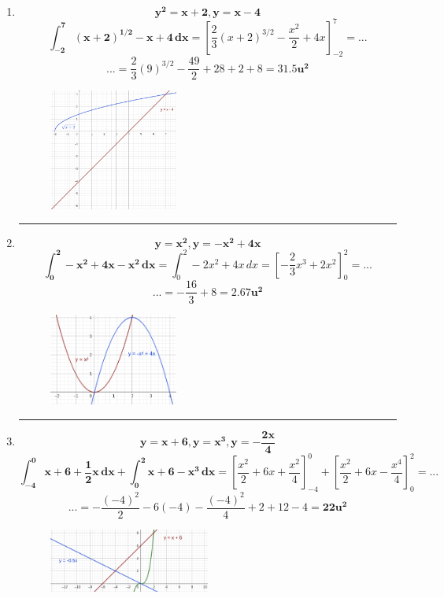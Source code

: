 \documentclass[12pt]{article}
\begin{document}
\begin{itemize}
\begin{enumerate}
                \newpage\hrule
                \item \[\bm{y^2 = x + 2, y = x - 4}\]
                    \[\bm{\int_{-2}^{7} (x + 2)^{1/2} - x + 4 \, dx} = \left[\frac{2}{3}(x + 2)^{3/2} - \frac{x^2}{2} + 4x\right]_{-2}^{7} = ...\]
                    \[... = \frac{2}{3}(9)^{3/2} - \frac{49}{2} + 28 + 2 + 8 =  \bm{31.5u^2}\]
                    \begin{figure}[h!]
                        \centering
                        \includegraphics[width=0.4\textwidth]{img/t6-ej2-7.png}
                    \end{figure}

                \hrule
                \item \[\bm{y = x^2, y = - x^2 + 4x}\]
                    \[\bm{\int_{0}^{2} - x^2 + 4x - x^2 \, dx} = \int_{0}^{2} - 2x^2 + 4x \, dx = \left[- \frac{2}{3}x^3 + 2x^2\right]_{0}^{2} = ...\]
                    \[... = - \frac{16}{3} + 8 = \bm{2.67u^2}\]
                    \begin{figure}[h!]
                        \centering
                        \includegraphics[width=0.4\textwidth]{img/t6-ej2-8.png}
                    \end{figure}

                \newpage\hrule
                \item \[\bm{y = x + 6, y = x^3, y = - \frac{2x}{4}}\]
                    \[\bm{\int_{-4}^{0} x + 6 + \frac{1}{2}x \, dx + \int_{0}^{2} x + 6 - x^3 \, dx} = \left[\frac{x^2}{2} + 6x + \frac{x^2}{4}\right]_{-4}^{0} + \left[\frac{x^2}{2} + 6x - \frac{x^4}{4}\right]_{0}^{2} = ...\]
                    \[... = - \frac{(-4)^2}{2} - 6(-4) - \frac{(-4)^2}{4} + 2 + 12 - 4 = \bm{22u^2}\]
                    \begin{figure}[h!]
                        \centering
                        \includegraphics[width=0.5\textwidth]{img/t6-ej2-9.png}
                    \end{figure}
                

\end{enumerate}
\end{itemize}
\end{document}
